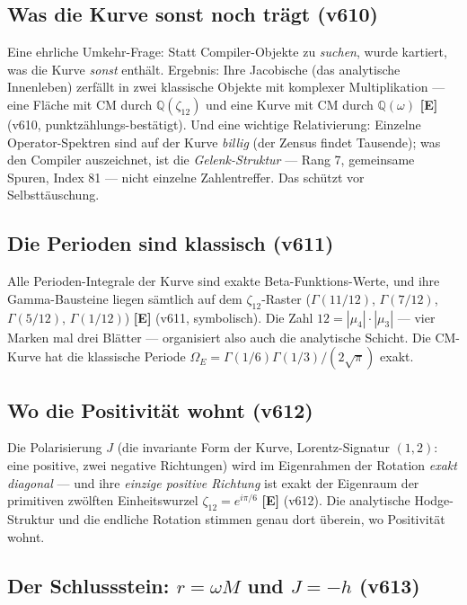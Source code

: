 \documentclass[11pt,a4paper]{article}
\newcommand{\E}{\textcolor{gut}{\textbf{[E]}}}
\begin{document}
\subsection*{Was die Kurve sonst noch trägt (v610)}

Eine ehrliche Umkehr-Frage: Statt Compiler-Objekte zu \emph{suchen},
wurde kartiert, was die Kurve \emph{sonst} enthält. Ergebnis: Ihre
Jacobische (das analytische \glqq{}Innenleben\grqq{}) zerfällt in zwei
klassische Objekte mit komplexer Multiplikation --- eine Fläche mit
CM durch $\mathbb{Q}(\zeta_{12})$ und eine Kurve mit CM durch
$\mathbb{Q}(\omega)$ \E{} (v610, punktzählungs-bestätigt). Und eine
wichtige Relativierung: Einzelne Operator-Spektren sind auf der Kurve
\emph{billig} (der Zensus findet Tausende); was den Compiler
auszeichnet, ist die \emph{Gelenk-Struktur} --- Rang 7, gemeinsame
Spuren, Index 81 --- nicht einzelne Zahlentreffer. Das schützt vor
Selbsttäuschung.

\subsection*{Die Perioden sind klassisch (v611)}

Alle Perioden-Integrale der Kurve sind exakte Beta-Funktions-Werte,
und ihre Gamma-Bausteine liegen sämtlich auf dem
$\zeta_{12}$-Raster ($\Gamma(11/12)$, $\Gamma(7/12)$, $\Gamma(5/12)$,
$\Gamma(1/12)$) \E{} (v611, symbolisch). Die Zahl
$12 = |\mu_4| \cdot |\mu_3|$ --- vier Marken mal drei Blätter ---
organisiert also auch die analytische Schicht. Die CM-Kurve hat die
klassische Periode $\Omega_E = \Gamma(1/6)\Gamma(1/3)/(2\sqrt{\pi})$
exakt.

\subsection*{Wo die Positivität wohnt (v612)}

Die Polarisierung $J$ (die invariante Form der Kurve,
Lorentz-Signatur $(1,2)$: eine positive, zwei negative Richtungen)
wird im Eigenrahmen der Rotation \emph{exakt diagonal} --- und ihre
\emph{einzige positive Richtung} ist exakt der Eigenraum der
primitiven zwölften Einheitswurzel $\zeta_{12} = e^{i\pi/6}$ \E{}
(v612). Die analytische Hodge-Struktur und die endliche Rotation
stimmen genau dort überein, wo Positivität wohnt.

\subsection*{Der Schlussstein: $r = \omega M$ und $J = -h$ (v613)}
\end{document}
